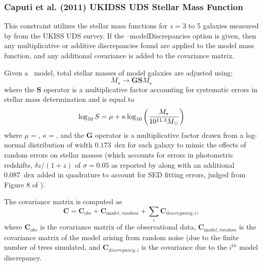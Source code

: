 \subsubsection{Caputi et al. (2011) UKIDSS UDS Stellar Mass Function}\label{sec:ConstraintsUKIDSSUDSStellarMassFunction}

This constraint utilizes the stellar mass functions for $z = 3$ to 5 galaxies measured by \cite{caputi_stellar_2011} from the UKISS UDS survey.  If the {\normalfont \ttfamily --modelDiscrepancies} option is given, then any multiplicative or additive discrepancies found are applied to the model mass function, and any additional covariance is added to the covariance matrix.

Given a \glc\ model, total stellar masses of model galaxies are adjusted using:
\begin{equation}
 M_\star \rightarrow {\mathbf G} {\mathbf S} M_\star 
\end{equation}
where the ${\mathbf S}$ operator is a multiplicative factor accounting for systematic errors in stellar mass determination and is equal to \citep{behroozi_comprehensive_2010}
\begin{equation}
 \log_{\mathrm 10} S = \mu + \kappa \log_{\mathrm 10} \left({M_\star \over 10^{11.3}M_\odot}\right)
\end{equation}
where $\mu=${\normalfont {}}, $\kappa=${\normalfont {}}, and the {\normalfont \bfseries G} operator is a multiplicative factor drawn from a log-normal distribution of width $0.173$~dex for each galaxy to mimic the effects of random errors on stellar masses (which accounts for errors in photometric redshifts, $\delta z/(1+z)$ of $\sigma=0.05$ as reported by \cite{caputi_stellar_2011} along with an additional 0.087~dex added in quadrature to account for SED fitting errors, judged from Figure 8 of \cite{caputi_stellar_2011}).

The covariance matrix is computed as
\begin{equation}
 {\mathbf C} = {\mathbf C}_{\mathrm obs} + {\mathbf C}_{\mathrm model,random} + \sum_i {\mathbf C}_{{\mathrm discrepancy}, i},
\end{equation}
where ${\mathbf C}_{\mathrm obs}$ is the covariance matrix of the observational data, ${\mathbf C}_{\mathrm model,random}$ is the covariance matrix of the model arising from random noise (due to the finite number of trees simulated, and ${\mathbf C}_{{\mathrm discrepancy}, i}$ is the covariance due to the $i^{\mathrm th}$ model discrepancy.


